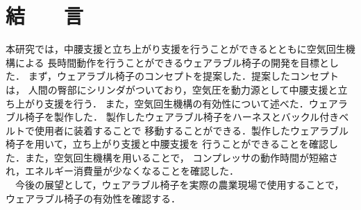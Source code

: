 \section{結　　言}
本研究では，中腰支援と立ち上がり支援を行うことができるとともに空気回生機構による
長時間動作を行うことができるウェアラブル椅子の開発を目標とした．
まず，ウェアラブル椅子のコンセプトを提案した．提案したコンセプトは，
人間の臀部にシリンダがついており，空気圧を動力源として中腰支援と立ち上がり支援を行う．
また，空気回生機構の有効性について述べた．ウェアラブル椅子を製作した．
製作したウェアラブル椅子をハーネスとバックル付きベルトで使用者に装着することで
移動することができる．製作したウェアラブル椅子を用いて，立ち上がり支援と中腰支援を
行うことができることを確認した．また，空気回生機構を用いることで，
コンプレッサの動作時間が短縮され，エネルギー消費量が少なくなることを確認した．\\
　今後の展望として，ウェアラブル椅子を実際の農業現場で使用することで，
ウェアラブル椅子の有効性を確認する．